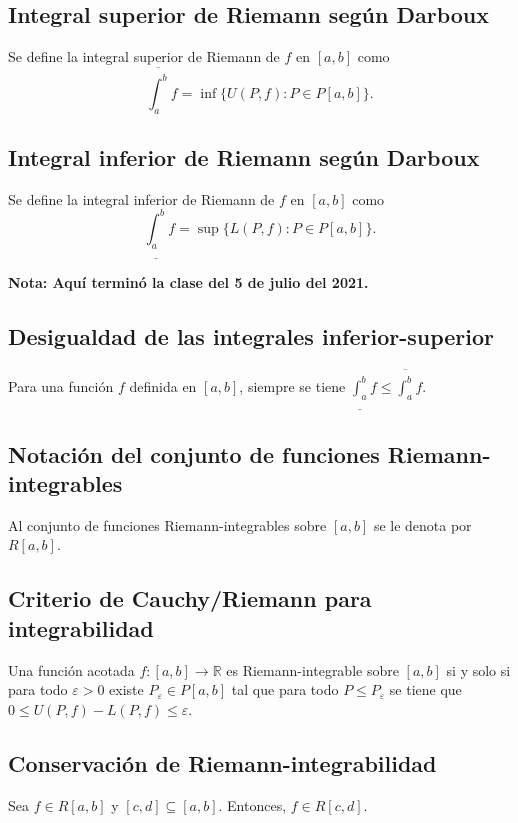 \documentclass{article}
\begin{document}
\subsection*{Integral superior de Riemann según Darboux}
Se define la integral superior de Riemann de $f$ en $[a,b]$ como
$$\overline{\int_{a}^{b}}f=\inf\big\{U(P,f): P\in P[a,b]\big\}.$$

\subsection*{Integral inferior de Riemann según Darboux}
Se define la integral inferior de Riemann de $f$ en $[a,b]$ como
$$\underline{\int_{a}^{b}}f=\sup\big\{L(P,f): P\in P[a,b]\big\}.$$

\vspace{10pt}
\textbf{Nota: Aquí terminó la clase del 5 de julio del 2021.}
\newpage

\subsection*{Desigualdad de las integrales inferior-superior}

Para una función $f$ definida en $[a,b]$, siempre se tiene $\displaystyle \underline{\int_{a}^{b}}f\leq \overline{\int_{a}^{b}}f$.

\subsection*{Notación del conjunto de funciones Riemann-integrables}

Al conjunto de funciones Riemann-integrables sobre $[a,b]$ se le denota por $R[a,b]$.

\subsection*{Criterio de Cauchy/Riemann para integrabilidad}

Una función acotada $f:[a,b]\to\mathbb{R}$ es Riemann-integrable sobre $[a,b]$ si y solo si para todo $\varepsilon>0$ existe $P_{\varepsilon}\in P[a,b]$ tal que para todo $P\leq P_{\varepsilon}$ se tiene que $0\leq U(P,f)-L(P,f)\leq\varepsilon$.

\subsection*{Conservación de Riemann-integrabilidad}

Sea $f\in R[a,b]$ y $[c,d]\subseteq [a,b]$. Entonces, $f\in R[c,d]$.
\end{document}
